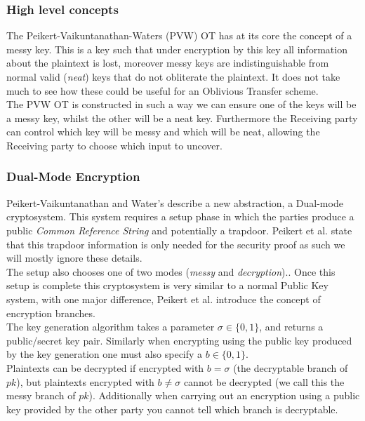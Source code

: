 \documentclass[ %
                    author={Nicholas Tutte},
                supervisor={Prof. Nigel Smart},
                    degree={MEng},
                     title={Secure Two Party Computation},
                  subtitle={A practical comparison of recent protocols},
                      type={Research - GG1K},
                      year={2015} ]{dissertation}
\begin{document}
				\subsubsection{High level concepts}
					{The Peikert-Vaikuntanathan-Waters (PVW) OT has at its core the concept of a messy key. This is a key such that under encryption by this key all information about the plaintext is lost, moreover messy keys are indistinguishable from normal valid (\emph{neat}) keys that do not obliterate the plaintext. It does not take much to see how these could be useful for an Oblivious Transfer scheme.}\\

					{The PVW OT is constructed in such a way we can ensure one of the keys will be a messy key, whilst the other will be a neat key. Furthermore the Receiving party can control which key will be messy and which will be neat, allowing the Receiving party to choose which input to uncover.}

				\subsubsection{Dual-Mode Encryption}
					{Peikert-Vaikuntanathan and Water's describe a new abstraction, a Dual-mode cryptosystem. This system requires a setup phase in which the parties produce a public \emph{Common Reference String} and potentially a trapdoor. Peikert et al. state that this trapdoor information is only needed for the security proof as such we will mostly ignore these details.}\\

					{The setup also chooses one of two modes (\emph{messy} and \emph{decryption}).. Once this setup is complete this cryptosystem is very similar to a normal Public Key system, with one major difference, Peikert et al. introduce the concept of encryption branches.}\\
					
					{The key generation algorithm takes a parameter $\sigma \in \{0, 1\}$, and returns a public/secret key pair. Similarly when encrypting using the public key produced by the key generation one must also specify a $b \in \{0, 1\}$.}\\

					{Plaintexts can be decrypted if encrypted with $b = \sigma$ (the decryptable branch of $pk$), but plaintexts encrypted with $b \neq \sigma$ cannot be decrypted (we call this the messy branch of $pk$). Additionally when carrying out an encryption using a public key provided by the other party you cannot tell which branch is decryptable.}\\
\end{document}

